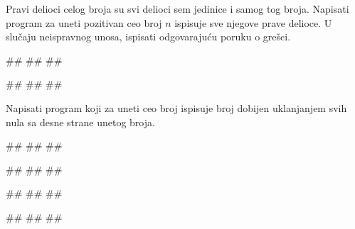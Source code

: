 \begin{Exercise}[label=PET_08] 
Pravi delioci celog broja su svi delioci sem jedinice i samog tog
broja. Napisati program za uneti pozitivan ceo broj $n$
ispisuje sve njegove prave delioce.
U slučaju neispravnog unosa, ispisati odgovarajuću poruku o grešci.


\begin{miditest}
\begin{upotreba}{1}
#\naslovInt#
##
##
\end{upotreba}
\end{miditest}
\begin{miditest}
\begin{upotreba}{2}
#\naslovInt#
##
##
\end{upotreba}
\end{miditest}
\end{Exercise}
\ifresenja
\begin{Answer}[ref=PET_08]
\end{Answer}
\fi


\begin{Exercise}[label=PET_09] 
Napisati program koji za uneti ceo broj ispisuje broj dobijen
uklanjanjem svih nula sa desne strane unetog broja.
 

\begin{miditest}
\begin{upotreba}{1}
#\naslovInt#
##
##
\end{upotreba}
\end{miditest}
\begin{miditest}
\begin{upotreba}{2}
#\naslovInt#
##
##
\end{upotreba}
\end{miditest}

\begin{miditest}
\begin{upotreba}{3}
#\naslovInt#
##
##
\end{upotreba}
\end{miditest}
\begin{miditest}
\begin{upotreba}{4}
#\naslovInt#
##
##
\end{upotreba}
\end{miditest}

\end{Exercise}
\ifresenja
\begin{Answer}[ref=PET_09]
\end{Answer}
\fi


